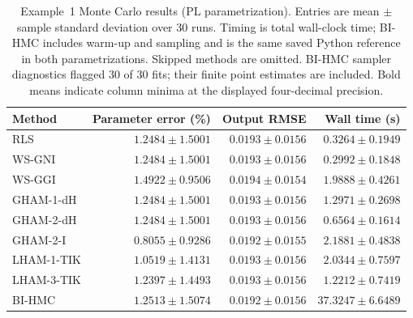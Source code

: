 \begin{table}[tbp]
\centering
\small
\setlength{\tabcolsep}{4pt}
\caption{Example~1 Monte Carlo results (PL parametrization). Entries are mean $\pm$ sample standard deviation over 30 runs. Timing is total wall-clock time; BI-HMC includes warm-up and sampling and is the same saved Python reference in both parametrizations. Skipped methods are omitted. BI-HMC sampler diagnostics flagged 30 of 30 fits; their finite point estimates are included. Bold means indicate column minima at the displayed four-decimal precision.}
\label{tab:example-1-montecarlo-pl}
\begin{tabular}{lrrr}
\toprule
Method & Parameter error (\%) & Output RMSE & Wall time (s) \\
\midrule
RLS & $1.2484 \pm 1.5001$ & $0.0193 \pm 0.0156$ & $0.3264 \pm 0.1949$ \\
WS-GNI & $1.2484 \pm 1.5001$ & $0.0193 \pm 0.0156$ & $\mathbf{0.2992} \pm 0.1848$ \\
WS-GGI & $1.4922 \pm 0.9506$ & $0.0194 \pm 0.0154$ & $1.9888 \pm 0.4261$ \\
GHAM-1-dH & $1.2484 \pm 1.5001$ & $0.0193 \pm 0.0156$ & $1.2971 \pm 0.2698$ \\
GHAM-2-dH & $1.2484 \pm 1.5001$ & $0.0193 \pm 0.0156$ & $0.6564 \pm 0.1614$ \\
GHAM-2-I & $\mathbf{0.8055} \pm 0.9286$ & $\mathbf{0.0192} \pm 0.0155$ & $2.1881 \pm 0.4838$ \\
LHAM-1-TIK & $1.0519 \pm 1.4131$ & $0.0193 \pm 0.0156$ & $2.0344 \pm 0.7597$ \\
LHAM-3-TIK & $1.2397 \pm 1.4493$ & $0.0193 \pm 0.0156$ & $1.2212 \pm 0.7419$ \\
BI-HMC & $1.2513 \pm 1.5074$ & $\mathbf{0.0192} \pm 0.0156$ & $37.3247 \pm 6.6489$ \\
\bottomrule
\end{tabular}
\end{table}

